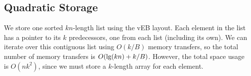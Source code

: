 \subsection*{Quadratic Storage}
We store one sorted $kn$-length list using the vEB layout. Each element in the list has 
a pointer to its $k$ predecessors, one from each list (including its own). 
We can iterate over this contiguous list using $O(k/B)$ memory transfers, 
so the total number of memory transfers is $O(\lg \mathopen{}\left(kn\right)\mathclose{} + k/B)$. However, the
total space usage is $O(nk^2)$, since we must store a $k$-length array for each element.



